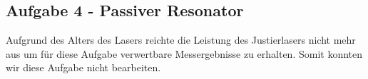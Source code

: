 \subsection{Aufgabe 4 - Passiver Resonator}

Aufgrund des Alters des Lasers reichte die Leistung des Justierlasers nicht mehr aus um für diese Aufgabe verwertbare Messergebnisse zu erhalten. Somit konnten wir diese Aufgabe nicht bearbeiten.